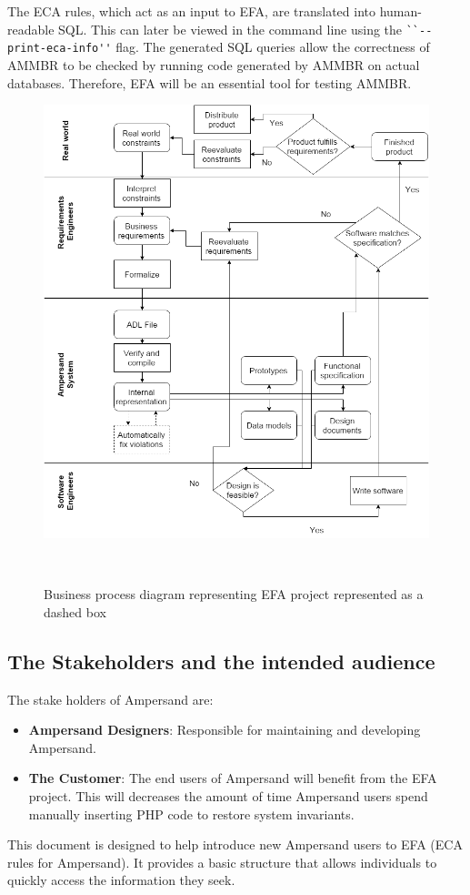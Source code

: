 The ECA rules, which act as an input to EFA, are translated into human-readable
SQL. This can later be viewed in the command line using the
\verb|``--print-eca-info''| flag.  The generated SQL queries allow the
correctness of AMMBR to be checked by running code generated by AMMBR on actual
databases. Therefore, EFA will be an essential tool for testing AMMBR.

\begin{figure}[!htb]
\begin{center}
\includegraphics[width=\textwidth]{../figures/business_process}
\caption{Business process diagram representing EFA project represented as a dashed box}~\label{fig:EFAproject}
\end{center}
\end{figure}

 \subsection{The Stakeholders and the intended audience}\label{sec:Stakeholders}
The stake holders of Ampersand are:

\begin{itemize}
	\item \textbf{Ampersand Designers}: Responsible for maintaining and developing Ampersand.
	\item \textbf{The Customer}: The end users of Ampersand will benefit from the EFA project. This will decreases the amount of time 
Ampersand users spend manually inserting PHP code to restore system invariants. 
\end{itemize}

This document is designed to help introduce new Ampersand users to EFA 
(ECA rules for Ampersand). It provides a basic structure that allows 
individuals to quickly access the information they seek. 
